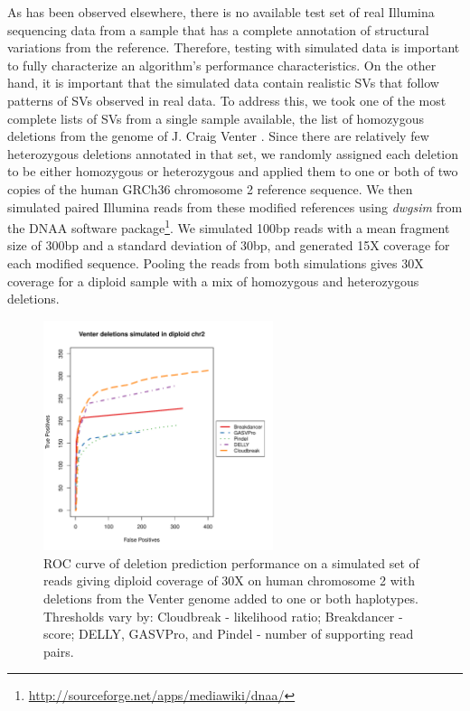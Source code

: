 \documentclass[11pt]{article}
\begin{document}
As has been observed elsewhere, there is no available test set of real Illumina sequencing data from a sample that has a complete annotation of structural variations from the reference. Therefore, testing with simulated data is important to fully characterize an algorithm's performance characteristics. On the other hand, it is important that the simulated data contain realistic SVs that follow patterns of SVs observed in real data. To address this, we took one of the most complete lists of SVs from a single sample available, the list of homozygous deletions from the genome of J. Craig Venter \autocite{Levy:2007fb}. Since there are relatively few heterozygous deletions annotated in that set, we randomly assigned each deletion to be either homozygous or heterozygous and applied them to one or both of two copies of the human GRCh36 chromosome 2 reference sequence. We then simulated paired Illumina reads from these modified references using \emph{dwgsim} from the DNAA software package\footnote{\url{http://sourceforge.net/apps/mediawiki/dnaa/}}. We simulated 100bp reads with a mean fragment size of 300bp and a standard deviation of 30bp, and generated 15X coverage for each modified sequence. Pooling the reads from both simulations gives 30X coverage for a diploid sample with a mix of homozygous and heterozygous deletions.

\begin{figure}[t]
\centering
\includegraphics[width=0.6\textwidth]{CHR2SIM_ROC_NEW.pdf}
\caption{ROC curve of deletion prediction performance on a simulated set of reads giving diploid coverage of 30X on human chromosome 2 with deletions from the Venter genome added to one or both haplotypes. Thresholds vary by: Cloudbreak - likelihood ratio; Breakdancer - score; DELLY, GASVPro, and Pindel - number of supporting read pairs.}
\label{chr2roc}
\end{figure}
\end{document}
